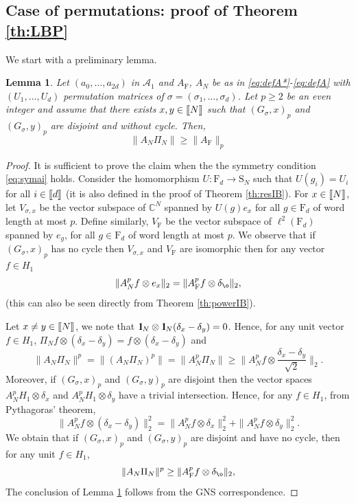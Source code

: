 \documentclass[11pt]{article}
\renewcommand{\star}{{\mathrm{F}}}
\newtheorem{lemma}{Lemma}[section]
\newcommand{\cA}{\mathcal{A}}
\newcommand{\dF}{\mathrm{F}}
\newcommand{\dS}{\mathrm{S}}
\newcommand{\dC}{\mathbb {C}}
\newcommand{\1}{1\!\!{\sf I}}
\newcommand{\IND}{\1}
\newcommand{\INT}[1]{{{\left[\hspace{-1.4pt}\left[#1\right]\hspace{-1.4pt}\right]}}}
\begin{document}
\subsection{Case of permutations: proof of Theorem \ref{th:LBP}}

We start with a preliminary lemma.


\begin{lemma}\label{le:LBP}
Let $(a_0,\ldots,a_{2d})$ in $\cA_1$ and $A_\star$, $A_N$ be as in \eqref{eq:defA*}-\eqref{eq:defA} with  $(U_1,\ldots, U_d)$ permutation matrices of $\sigma = (\sigma_1,\ldots, \sigma_d)$. Let $p \geq 2$ be an even integer and assume that there exists $x,y \in \INT{N}$ such that  $(G_\sigma,x)_p$ and $(G_\sigma,y)_p$ are disjoint and without cycle. Then, 
$$
\| A_N \Pi_N \| \geq \| A_\star \|_{p}
$$
\end{lemma}

\begin{proof}
It is sufficient to prove the claim  when the the symmetry condition \eqref{eq:symai} holds.  Consider the homomorphism $U: \dF_d \to \dS_N$ such that $U(g_i) = U_i$ for all $i \in \INT{d}$ (it is also defined in the proof of Theorem  \ref{th:resIB}). For $x \in \INT{N}$, let $V_{\sigma,x}$  be the vector subspace of $\dC^N$ spanned by $U(g)e_x $ for all $g \in \dF_d$ of word length at most $p$. Define similarly, $V_{\star}$ be the vector subspace of $\ell^2 (\dF_d)$ spanned  by $e_{g}$, for all $g \in \dF_d$ of word length at most $p$. We observe that if $(G_\sigma,x)_p$  has no cycle then $V_{\sigma,x}$ and $V_\star$ are isomorphic then for any vector $f \in H_1$
$$
\| A_N ^p f \otimes e_x \|_2 = \| A_\star ^p f \otimes \delta_{\o} \|_2,
$$
(this can also be seen directly from Theorem \ref{th:powerIB}). 

Let $x \ne y \in \INT{N}$, we note that  $\IND_N \otimes \IND_N (\delta_x - \delta_y) = 0$.
Hence, for any unit vector $f \in H_1$, $\Pi_N f \otimes  (\delta_x - \delta_y) = f \otimes  (\delta_x - \delta_y)$ and
$$
\| A_N \Pi_N   \|^p =  \| (A_N \Pi_N)^p   \| = \| A^p _N \Pi_N    \| \geq \| A_N ^p f \otimes \frac{ \delta_x - \delta_{y}}{\sqrt 2} \|_2 .
$$
Moreover,  if $(G_\sigma,x)_p$ and  $(G_\sigma,y)_p$ are disjoint then the vector spaces $A_N ^p H_1 \otimes \delta_x $ and $A_N ^p H_1 \otimes \delta_{y} $ have a trivial intersection.  Hence, for any $f \in H_1$, from Pythagoras' theorem,
$$
\| A_N^p f \otimes ( \delta_x - \delta_{y})\|^2_2 =  \| A_N^p f \otimes \delta_x\|^2_2 + \| A_N^p f \otimes \delta_{y}\|^2_2.
$$ 
We obtain that if $(G_\sigma,x)_p$ and  $(G_\sigma,y)_p$ are disjoint and have no cycle, then for any unit $f \in H_1$,
$$
\| A_N \Pi_N   \|^p  \geq \| A_\star ^p f \otimes \delta_{\o} \|_2,
$$
The conclusion of Lemma \ref{le:LBP} follows from the GNS correspondence. 
\end{proof}
\end{document}
